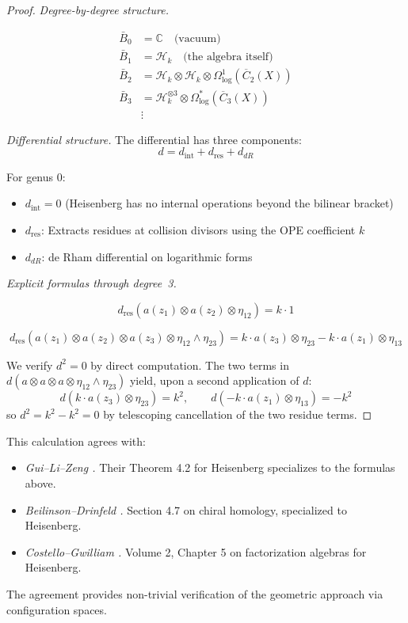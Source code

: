 \begin{proof}
\emph{Degree-by-degree structure.}

\begin{align}
\bar{B}_0 &= \mathbb{C} \quad \text{(vacuum)} \\
\bar{B}_1 &= \mathcal{H}_k \quad \text{(the algebra itself)} \\
\bar{B}_2 &= \mathcal{H}_k \otimes \mathcal{H}_k \otimes \Omega^1_{\log}(\overline{C}_2(X)) \\
\bar{B}_3 &= \mathcal{H}_k^{\otimes 3} \otimes \Omega^*_{\log}(\overline{C}_3(X)) \\
&\vdots
\end{align}

\emph{Differential structure.}
The differential has three components:
\[d = d_{\text{int}} + d_{\text{res}} + d_{dR}\]

For genus 0:
\begin{itemize}
\item $d_{\text{int}} = 0$ (Heisenberg has no internal operations beyond the bilinear bracket)
\item $d_{\text{res}}$: Extracts residues at collision divisors using the OPE coefficient $k$
\item $d_{dR}$: de Rham differential on logarithmic forms
\end{itemize}

\emph{Explicit formulas through degree~3.}

\[d_{\text{res}}(a(z_1) \otimes a(z_2) \otimes \eta_{12}) = k \cdot 1\]

\[d_{\text{res}}(a(z_1) \otimes a(z_2) \otimes a(z_3) \otimes \eta_{12} \wedge \eta_{23}) = k \cdot a(z_3) \otimes \eta_{23} - k \cdot a(z_1) \otimes \eta_{13}\]

We verify $d^2 = 0$ by direct computation. The two terms in $d(a \otimes a \otimes a \otimes \eta_{12} \wedge \eta_{23})$ yield, upon a second application of $d$:
\[d(k \cdot a(z_3) \otimes \eta_{23}) = k^2, \qquad d(-k \cdot a(z_1) \otimes \eta_{13}) = -k^2\]
so $d^2 = k^2 - k^2 = 0$ by telescoping cancellation of the two residue terms.
\end{proof}

\begin{remark}\label{rem:heisenberg-literature}
This calculation agrees with:
\begin{itemize}
\item \emph{Gui--Li--Zeng \cite{GLZ22}.} Their Theorem 4.2 for Heisenberg specializes to the formulas above.
\item \emph{Beilinson--Drinfeld \cite{BD04}.} Section 4.7 on chiral homology, specialized to Heisenberg.
\item \emph{Costello--Gwilliam \cite{CG17}.} Volume 2, Chapter 5 on factorization algebras for Heisenberg.
\end{itemize}

The agreement provides non-trivial verification of the geometric approach via configuration spaces.
\end{remark}

